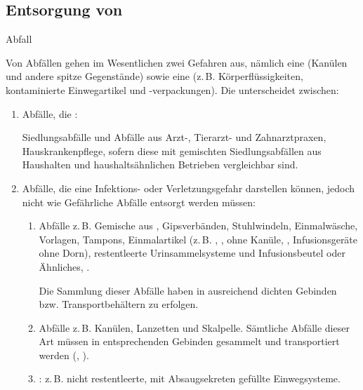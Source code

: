 \subsection{Entsorgung von }

\Text
{Abfall}%
{%
\label{topic:entsorgung-infektioeser-abfall}%
\label{topic:abfall-infektioeser-entsorgung}%
%
Von Abfällen gehen im Wesentlichen zwei Gefahren aus,
nämlich eine  (Kanülen und andere
spitze Gegenstände) sowie eine 
(z.\,B. Körperflüssigkeiten, kontaminierte Einwegartikel
und -verpackungen). 
Die  \cite{OenormS2104-2005}
unterscheidet zwischen:
\begin{enumerate}
  \item Abfälle, die :
  \label{item:hyg-abfall-oenorm-gruppe1}
  
  Siedlungsabfälle und Abfälle aus Arzt-, Tierarzt- und
  Zahnarztpraxen, Hauskrankenpflege, sofern diese mit gemischten
  Siedlungsabfällen aus Haushalten und haushaltsähnlichen
  Betrieben vergleichbar sind.

  \item Abfälle, die  eine Infektions- oder Verletzungsgefahr
  darstellen können, jedoch nicht wie Gefährliche Abfälle
  entsorgt werden müssen:
  \label{item:hyg-abfall-oenorm-gruppe2}
  \begin{enumerate}
    \item Abfälle  z.\,B.
    Gemische aus , Gipsverbänden,
    Stuhlwindeln, Einmalwäsche, Vorlagen, Tampons,
    Einmalartikel (z.\,B. , ,
     ohne Kanüle, ,
    Infusionsgeräte ohne Dorn), restentleerte
    Urinsammelsysteme und Infusionsbeutel oder Ähnliches,
    .
    
    Die Sammlung dieser Abfälle haben in
    ausreichend dichten Gebinden bzw. Transportbehältern zu
    erfolgen.
    \item Abfälle 
    z.\,B. Kanülen, Lanzetten und
    Skalpelle. Sämtliche Abfälle dieser Art müssen in
    entsprechenden Gebinden gesammelt und transportiert
    werden (,
    ).
    \item {}:
    z.\,B. nicht restentleerte, mit Absaugsekreten gefüllte
    Einwegsysteme.
    

\end{enumerate}
\end{enumerate}}
